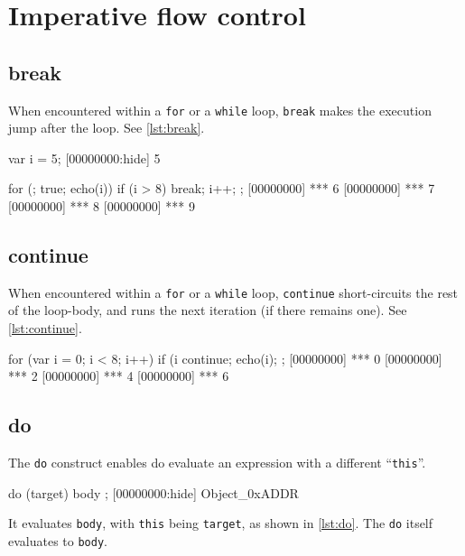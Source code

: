 \FloatBarrier
\section{Imperative flow control}

\subsection{break}

When encountered within a \lstinline|for| or a \lstinline|while| loop,
\lstinline|break| makes the execution jump after the loop. See
\autoref{lst:break}.

\begin{urbiscript}[caption=Using break, label=lst:break,
  float=\floatpos]
var i = 5;
[00000000:hide] 5

for (; true; echo(i))
{
  if (i > 8)
    break;
  i++;
};
[00000000] *** 6
[00000000] *** 7
[00000000] *** 8
[00000000] *** 9
\end{urbiscript}

\subsection{continue}

When encountered within a \lstinline|for| or a \lstinline|while| loop,
\lstinline|continue| short-circuits the rest of the loop-body, and
runs the next iteration (if there remains one). See
\autoref{lst:continue}.

\begin{urbiscript}[caption=Using continue, label=lst:continue,
  float=\floatpos]
for (var i = 0; i < 8; i++)
{
  if (i %
    continue;
  echo(i);
};
[00000000] *** 0
[00000000] *** 2
[00000000] *** 4
[00000000] *** 6
\end{urbiscript}

\subsection{do}

The \lstinline|do| construct enables do evaluate an expression with a
different ``\lstinline|this|''.

\begin{urbiscript}[frame=, backgroundcolor=, ]
do (target)
{
  body
};
[00000000:hide] Object_0xADDR

\end{urbiscript}

It evaluates \lstinline|body|, with \lstinline|this| being
\lstinline|target|, as shown in \autoref{lst:do}.  The \lstinline|do| itself
evaluates to \lstinline|body|.

